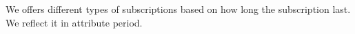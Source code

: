 

We offers different types of subscriptions based on how long the subscription last. We reflect it in attribute period.

